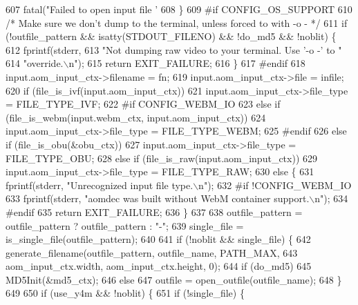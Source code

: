 \begin{DoxyCodeInclude}
{{{{{{{{{{{{{{{{{{{{{{{{{{{{{607     fatal(\textcolor{stringliteral}{"Failed to open input file '%
608   \}
609 \textcolor{preprocessor}{#if CONFIG\_OS\_SUPPORT}
610   \textcolor{comment}{/* Make sure we don't dump to the terminal, unless forced to with -o - */}
611   \textcolor{keywordflow}{if} (!outfile\_pattern && isatty(STDOUT\_FILENO) && !do\_md5 && !noblit) \{
612     fprintf(stderr,
613             \textcolor{stringliteral}{"Not dumping raw video to your terminal. Use '-o -' to "}
614             \textcolor{stringliteral}{"override.\(\backslash\)n"});
615     \textcolor{keywordflow}{return} EXIT\_FAILURE;
616   \}
617 \textcolor{preprocessor}{#endif}
618   input.aom\_input\_ctx->filename = fn;
619   input.aom\_input\_ctx->file = infile;
620   \textcolor{keywordflow}{if} (file\_is\_ivf(input.aom\_input\_ctx))
621     input.aom\_input\_ctx->file\_type = FILE\_TYPE\_IVF;
622 \textcolor{preprocessor}{#if CONFIG\_WEBM\_IO}
623   \textcolor{keywordflow}{else} \textcolor{keywordflow}{if} (file\_is\_webm(input.webm\_ctx, input.aom\_input\_ctx))
624     input.aom\_input\_ctx->file\_type = FILE\_TYPE\_WEBM;
625 \textcolor{preprocessor}{#endif}
626   \textcolor{keywordflow}{else} \textcolor{keywordflow}{if} (file\_is\_obu(&obu\_ctx))
627     input.aom\_input\_ctx->file\_type = FILE\_TYPE\_OBU;
628   \textcolor{keywordflow}{else} \textcolor{keywordflow}{if} (file\_is\_raw(input.aom\_input\_ctx))
629     input.aom\_input\_ctx->file\_type = FILE\_TYPE\_RAW;
630   \textcolor{keywordflow}{else} \{
631     fprintf(stderr, \textcolor{stringliteral}{"Unrecognized input file type.\(\backslash\)n"});
632 \textcolor{preprocessor}{#if !CONFIG\_WEBM\_IO}
633     fprintf(stderr, \textcolor{stringliteral}{"aomdec was built without WebM container support.\(\backslash\)n"});
634 \textcolor{preprocessor}{#endif}
635     \textcolor{keywordflow}{return} EXIT\_FAILURE;
636   \}
637 
638   outfile\_pattern = outfile\_pattern ? outfile\_pattern : \textcolor{stringliteral}{"-"};
639   single\_file = is\_single\_file(outfile\_pattern);
640 
641   \textcolor{keywordflow}{if} (!noblit && single\_file) \{
642     generate\_filename(outfile\_pattern, outfile\_name, PATH\_MAX,
643                       aom\_input\_ctx.width, aom\_input\_ctx.height, 0);
644     \textcolor{keywordflow}{if} (do\_md5)
645       MD5Init(&md5\_ctx);
646     \textcolor{keywordflow}{else}
647       outfile = open\_outfile(outfile\_name);
648   \}
649 
650   \textcolor{keywordflow}{if} (use\_y4m && !noblit) \{
651     \textcolor{keywordflow}{if} (!single\_file) \{
}}}}}}}}}}}}}}}}}}}}}}}}}}}}}}
\end{DoxyCodeInclude}
